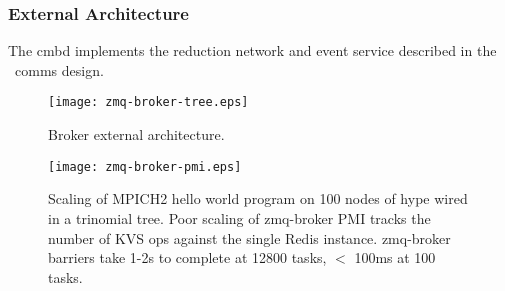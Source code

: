 \subsubsection {External Architecture}
The cmbd implements the reduction network and event service described
in the \ngrm\ comms design.

\begin{figure}
\centering
\texttt{[image: zmq-broker-tree.eps]}
\caption{Broker external architecture.}
\label{fig:cmbext}
\end{figure}

\begin{figure}
\centering
\texttt{[image: zmq-broker-pmi.eps]}
\caption{Scaling of MPICH2 hello world program on 100 nodes of hype wired
in a trinomial tree.  Poor scaling of zmq-broker PMI tracks the number of
KVS ops against the single Redis instance.  zmq-broker barriers take 1-2s
to complete at 12800 tasks, $<$ 100ms at 100 tasks.}
\label{fig:cmbext}
\end{figure}


